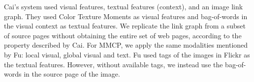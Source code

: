 

Cai's system used visual features, textual features (context),
and an image link graph. They used Color Texture Moments\cite{Yu03colortexture}
as visual features and bag-of-words in the visual context as textual features.
We replicate the link graph from a subset of source pages without
obtaining the entire set of web pages, according to the property described by
Cai.
For MMCP, we apply the same modalities mentioned by Fu:
local visual, global visual and text.
Fu used tags of the images in Flickr as the textual features.
However, without available tags, we instead use the bag-of-words
in the source page of the image.

